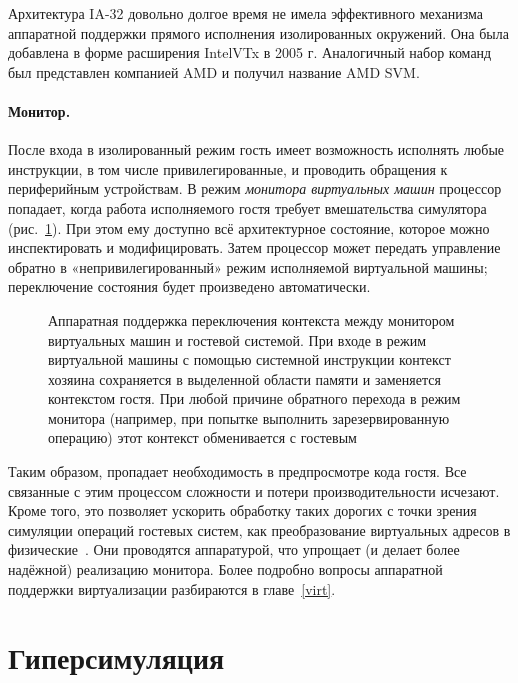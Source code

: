Архитектура IA-32 довольно долгое время не имела эффективного механизма аппаратной поддержки прямого исполнения изолированных окружений. Она была добавлена в форме расширения Intel\textregistered VTx в 2005 г. Аналогичный набор команд был представлен компанией AMD и получил название AMD SVM.

\paragraph{Монитор.} После входа в изолированный режим гость имеет возможность исполнять любые инструкции, в том числе привилегированные, и проводить обращения к периферийным устройствам. 
В режим \textit{монитора виртуальных машин} процессор попадает, когда работа исполняемого гостя требует вмешательства симулятора (рис.~\ref{fig:vm-assist}). При этом ему доступно всё архитектурное состояние, которое можно инспектировать и модифицировать. Затем процессор может передать управление обратно в «непривилегированный» режим исполняемой виртуальной машины; переключение состояния будет произведено автоматически.

\begin{figure}[htb]
    \centering
    \caption[Аппаратная поддержка переключения контекста между монитором виртуальных машин и гостевой системой]{Аппаратная поддержка переключения контекста между монитором виртуальных машин и гостевой системой. При входе в режим виртуальной машины с помощью системной инструкции контекст хозяина сохраняется в выделенной области памяти и заменяется контекстом гостя. При любой причине обратного перехода в режим монитора (например, при попытке выполнить зарезервированную операцию) этот контекст обменивается с гостевым}
    \label{fig:vm-assist}
\end{figure}

Таким образом, пропадает необходимость в предпросмотре кода гостя. Все связанные с этим процессом сложности и потери производительности исчезают. Кроме того, это позволяет ускорить обработку таких дорогих с точки зрения симуляции операций гостевых систем, как преобразование виртуальных адресов в физические~\cite{ulrich-virt-cost}. Они проводятся аппаратурой, что упрощает (и делает более надёжной) реализацию монитора.  Более подробно вопросы аппаратной поддержки виртуализации разбираются в главе~\ref{virt}.

\section{Гиперсимуляция}\label{sec:hypersim}

